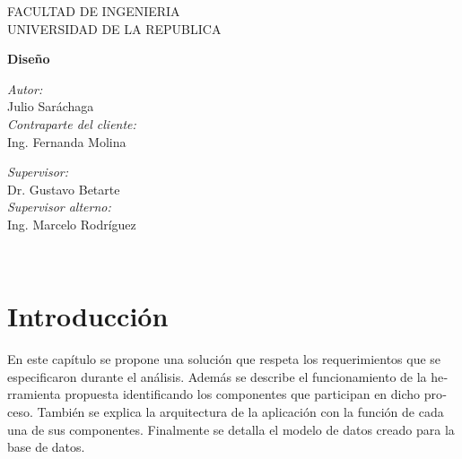 \documentclass[11pt]{article}
\title{}
\begin{document}
  
   \begin{titlepage}

\begin{center}
\vspace*{-1in}

FACULTAD DE INGENIERIA\\
\vspace*{0.15in}
UNIVERSIDAD DE LA REPUBLICA \\
\vspace*{0.6in}
\vspace*{0.2in}
\begin{Large}
\textbf{Diseño} \\
\end{Large}
\vspace*{0.3in}
\end{center}

\begin{minipage}{0.4\textwidth}
\begin{flushleft} \large
\emph{Autor:}\\
Julio Saráchaga\\
\bigskip
\emph{Contraparte del cliente:}\\
Ing. Fernanda Molina
\end{flushleft}
\end{minipage}
\begin{minipage}{0.4\textwidth}
\begin{flushright} \large
\emph{Supervisor:} \\
Dr. Gustavo Betarte\\
\bigskip
\emph{Supervisor alterno:} \\
Ing. Marcelo Rodríguez
\end{flushright}
\end{minipage}\\[3cm]

\end{titlepage}
\bigskip

\section[Introducción]{\foreignlanguage{spanish}{Introducción}}
\foreignlanguage{spanish}{En este capítulo se propone una solución que respeta los requerimientos que se especificaron
durante el análisis. Además se describe el funcionamiento de la herramienta propuesta identificando los componentes que
participan en dicho proceso. También se explica la arquitectura de la aplicación con la función de cada una de sus
componentes. Finalmente se detalla el modelo de datos creado para la base de datos.}
\end{document}
